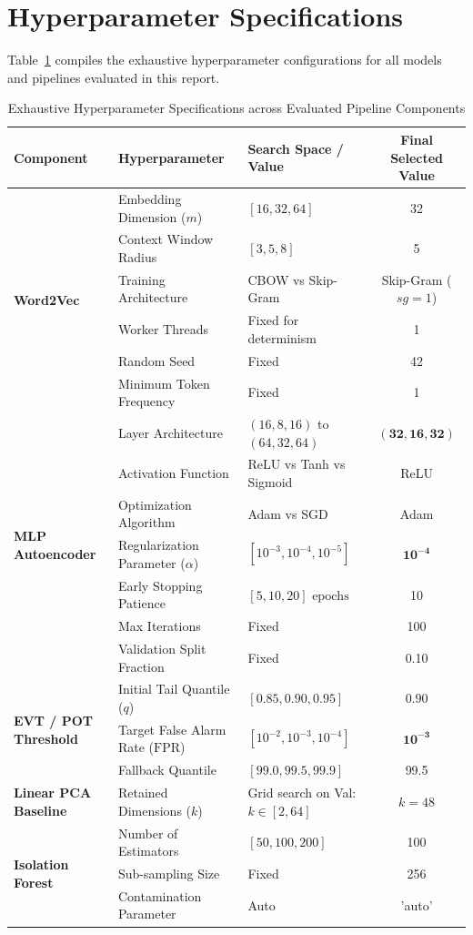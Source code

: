 \section{Hyperparameter Specifications}
\label{sec:appendix_hyperparams}
Table~\ref{tab:complete_hyperparameters} compiles the exhaustive hyperparameter configurations for all models and pipelines evaluated in this report.

\begin{table}[htbp]
\centering
\caption{Exhaustive Hyperparameter Specifications across Evaluated Pipeline Components}
\label{tab:complete_hyperparameters}
\begin{tabular}{lllc}
\toprule
\textbf{Component} & \textbf{Hyperparameter} & \textbf{Search Space / Value} & \textbf{Final Selected Value} \\
\midrule
\multirow{6}{*}{\textbf{Word2Vec}} & Embedding Dimension ($m$) & $[16, 32, 64]$ & 32 \\
& Context Window Radius & $[3, 5, 8]$ & 5 \\
& Training Architecture & CBOW vs Skip-Gram & Skip-Gram ($sg=1$) \\
& Worker Threads & Fixed for determinism & 1 \\
& Random Seed & Fixed & 42 \\
& Minimum Token Frequency & Fixed & 1 \\
\midrule
\multirow{7}{*}{\textbf{MLP Autoencoder}} & Layer Architecture & $(16, 8, 16)$ to $(64, 32, 64)$ & $\mathbf{(32, 16, 32)}$ \\
& Activation Function & ReLU vs Tanh vs Sigmoid & ReLU \\
& Optimization Algorithm & Adam vs SGD & Adam \\
& Regularization Parameter ($\alpha$) & $[10^{-3}, 10^{-4}, 10^{-5}]$ & $\mathbf{10^{-4}}$ \\
& Early Stopping Patience & $[5, 10, 20]\text{ epochs}$ & 10 \\
& Max Iterations & Fixed & 100 \\
& Validation Split Fraction & Fixed & 0.10 \\
\midrule
\multirow{3}{*}{\textbf{EVT / POT Threshold}} & Initial Tail Quantile ($q$) & $[0.85, 0.90, 0.95]$ & $\mathbf{0.90}$ \\
& Target False Alarm Rate ($\text{FPR}$) & $[10^{-2}, 10^{-3}, 10^{-4}]$ & $\mathbf{10^{-3}}$ \\
& Fallback Quantile & $[99.0, 99.5, 99.9]$ & 99.5 \\
\midrule
\textbf{Linear PCA Baseline} & Retained Dimensions ($k$) & Grid search on Val: $k \in [2, 64]$ & $k = 48$ \\
\midrule
\multirow{3}{*}{\textbf{Isolation Forest}} & Number of Estimators & $[50, 100, 200]$ & 100 \\
& Sub-sampling Size & Fixed & 256 \\
& Contamination Parameter & Auto & 'auto' \\
\bottomrule
\end{tabular}
\end{table}

